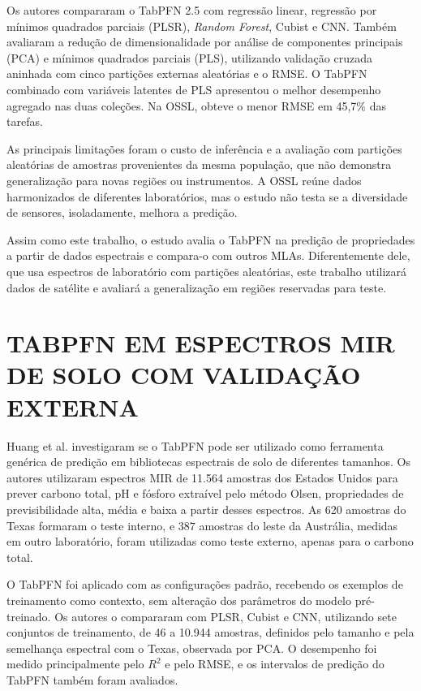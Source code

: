 Os autores compararam o TabPFN 2.5 com regressão linear, regressão por mínimos quadrados parciais (PLSR), \textit{Random Forest}, Cubist e CNN. Também avaliaram a redução de dimensionalidade por análise de componentes principais (PCA) e mínimos quadrados parciais (PLS), utilizando validação cruzada aninhada com cinco partições externas aleatórias e o RMSE. O TabPFN combinado com variáveis latentes de PLS apresentou o melhor desempenho agregado nas duas coleções. Na OSSL, obteve o menor RMSE em 45,7\% das tarefas.

As principais limitações foram o custo de inferência e a avaliação com partições aleatórias de amostras provenientes da mesma população, que não demonstra generalização para novas regiões ou instrumentos. A OSSL reúne dados harmonizados de diferentes laboratórios, mas o estudo não testa se a diversidade de sensores, isoladamente, melhora a predição.

Assim como este trabalho, o estudo avalia o TabPFN na predição de propriedades a partir de dados espectrais e compara-o com outros MLAs. Diferentemente dele, que usa espectros de laboratório com partições aleatórias, este trabalho utilizará dados de satélite e avaliará a generalização em regiões reservadas para teste.

\section{TABPFN EM ESPECTROS MIR DE SOLO COM VALIDAÇÃO EXTERNA}

Huang et al. \cite{huang2026} investigaram se o TabPFN pode ser utilizado como ferramenta genérica de predição em bibliotecas espectrais de solo de diferentes tamanhos. Os autores utilizaram espectros MIR de 11.564 amostras dos Estados Unidos para prever carbono total, pH e fósforo extraível pelo método Olsen, propriedades de previsibilidade alta, média e baixa a partir desses espectros. As 620 amostras do Texas formaram o teste interno, e 387 amostras do leste da Austrália, medidas em outro laboratório, foram utilizadas como teste externo, apenas para o carbono total.

O TabPFN foi aplicado com as configurações padrão, recebendo os exemplos de treinamento como contexto, sem alteração dos parâmetros do modelo pré-treinado. Os autores o compararam com PLSR, Cubist e CNN, utilizando sete conjuntos de treinamento, de 46 a 10.944 amostras, definidos pelo tamanho e pela semelhança espectral com o Texas, observada por PCA. O desempenho foi medido principalmente pelo $R^2$ e pelo RMSE, e os intervalos de predição do TabPFN também foram avaliados.

